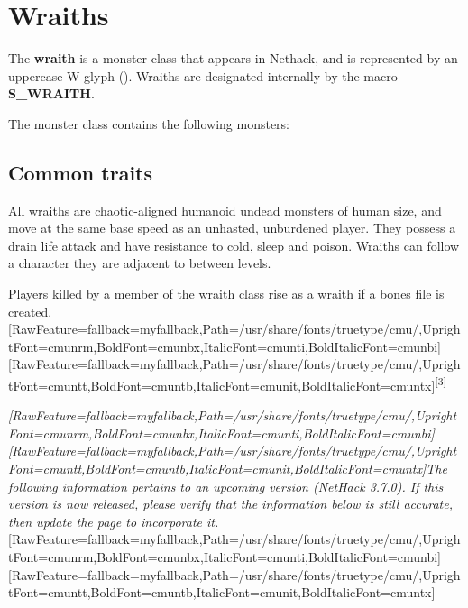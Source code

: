 \chapter{Wraiths}
The \textbf{wraith} is a monster class that appears in Nethack, and is represented by an uppercase W glyph (\whitesym[W]). Wraiths are designated internally by the macro \textbf{S\_WRAITH}.

The monster class contains the following monsters:

\begin{myitemize}
\item{}
\item{}\monsymlink[wraith]
\item{}\monsymlink[Nazgul]
\end{myitemize}

\section{Common traits}
All wraiths are chaotic-aligned humanoid undead monsters of human size, and move at the same base speed as an unhasted, unburdened player. They possess a drain life attack and have resistance to cold, sleep and poison. Wraiths can follow a character they are adjacent to between levels.

Players killed by a member of the wraith class rise as a wraith if a bones file is created.\allowbreak{}\setmainfont{cmunrm.ttf}[RawFeature={fallback=myfallback},Path=/usr/share/fonts/truetype/cmu/,UprightFont=cmunrm,BoldFont=cmunbx,ItalicFont=cmunti,BoldItalicFont=cmunbi]\setmonofont{cmunrm.ttf}[RawFeature={fallback=myfallback},Path=/usr/share/fonts/truetype/cmu/,UprightFont=cmuntt,BoldFont=cmuntb,ItalicFont=cmunit,BoldItalicFont=cmuntx]\textsuperscript{{$\text{[}$}3{$\text{]}$}}


{\itshape \allowbreak{}\setmainfont{cmunti.ttf}[RawFeature={fallback=myfallback},Path=/usr/share/fonts/truetype/cmu/,UprightFont=cmunrm,BoldFont=cmunbx,ItalicFont=cmunti,BoldItalicFont=cmunbi]\setmonofont{cmunti.ttf}[RawFeature={fallback=myfallback},Path=/usr/share/fonts/truetype/cmu/,UprightFont=cmuntt,BoldFont=cmuntb,ItalicFont=cmunit,BoldItalicFont=cmuntx]\itshape The following information pertains to an upcoming version (NetHack 3.7.0\footnotemark[19]). If this version is now released, please verify that the information below is still accurate, then update the page to incorporate it.}\allowbreak{}\setmainfont{cmunrm.ttf}[RawFeature={fallback=myfallback},Path=/usr/share/fonts/truetype/cmu/,UprightFont=cmunrm,BoldFont=cmunbx,ItalicFont=cmunti,BoldItalicFont=cmunbi]\setmonofont{cmunrm.ttf}[RawFeature={fallback=myfallback},Path=/usr/share/fonts/truetype/cmu/,UprightFont=cmuntt,BoldFont=cmuntb,ItalicFont=cmunit,BoldItalicFont=cmuntx]



